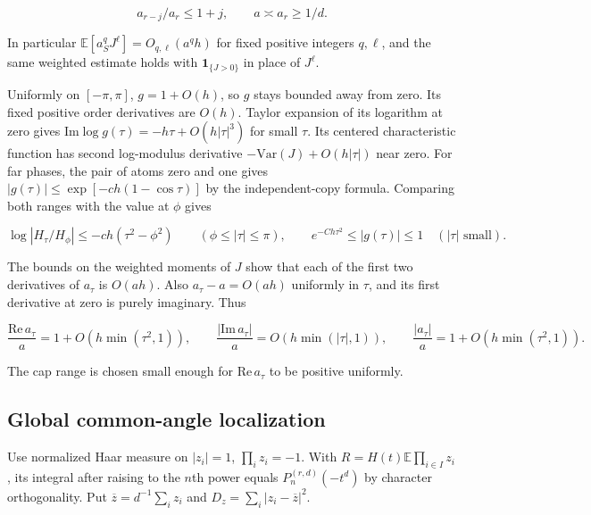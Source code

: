 \begin{equation*}
a_{r-j}/a_r\le1+j,\qquad a\asymp a_r\ge 1/d.
\end{equation*}

In particular $\mathbb E[a_S^q J^\ell]=O_{q,\ell}(a^q h)$ for fixed positive integers $q,\ell$, and the same weighted estimate holds with $\mathbf1_{\{J>0\}}$ in place of $J^\ell$.

Uniformly on $[-\pi,\pi]$, $g=1+O(h)$, so $g$ stays bounded away from zero. Its fixed positive order derivatives are $O(h)$. Taylor expansion of its logarithm at zero gives $\mathrm{Im}\log g(\tau)=-h\tau+O(h|\tau|^3)$ for small $\tau$. Its centered characteristic function has second log-modulus derivative $-\mathrm{Var}(J)+O(h|\tau|)$ near zero. For far phases, the pair of atoms zero and one gives $|g(\tau)|\le\exp[-ch(1-\cos\tau)]$ by the independent-copy formula. Comparing both ranges with the value at $\phi$ gives

\begin{equation}
\log|H_\tau/H_\phi|\le -ch(\tau^2-\phi^2)\qquad(\phi\le|\tau|\le\pi),
\qquad
e^{-Ch\tau^2}\le |g(\tau)|\le1\quad (|\tau|\text{ small}).
\tag{S1}
\end{equation}

The bounds on the weighted moments of $J$ show that each of the first two derivatives of $a_\tau$ is $O(ah)$. Also $a_\tau-a=O(ah)$ uniformly in $\tau$, and its first derivative at zero is purely imaginary. Thus

\begin{equation}
\frac{\mathrm{Re}\,a_\tau}{a}=1+O(h\min(\tau^2,1)),\qquad
\frac{|\mathrm{Im}\,a_\tau|}{a}=O(h\min(|\tau|,1)),\qquad
\frac{|a_\tau|}{a}=1+O(h\min(\tau^2,1)).
\tag{S2}
\end{equation}

The cap range is chosen small enough for $\mathrm{Re}\,a_\tau$ to be positive uniformly.

\subsection{Global common-angle localization}

Use normalized Haar measure on $|z_i|=1$, $\prod_i z_i=-1$. With $R=H(t)\mathbb E\prod_{i\in I}z_i$, its integral after raising to the $n$th power equals $P_n^{(r,d)}(-t^d)$ by character orthogonality. Put $\overline z=d^{-1}\sum_i z_i$ and $D_z=\sum_i|z_i-\overline z|^2$.

